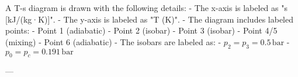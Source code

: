 A T-s diagram is drawn with the following details:  
- The x-axis is labeled as "s [kJ/(kg·K)]".  
- The y-axis is labeled as "T (K)".  
- The diagram includes labeled points:  
  - Point 1 (adiabatic)  
  - Point 2 (isobar)  
  - Point 3 (isobar)  
  - Point 4/5 (mixing)  
  - Point 6 (adiabatic)  
- The isobars are labeled as:  
  - \( p_2 = p_3 = 0.5 \, \text{bar} \)  
  - \( p_0 = p_c = 0.191 \, \text{bar} \)  

---